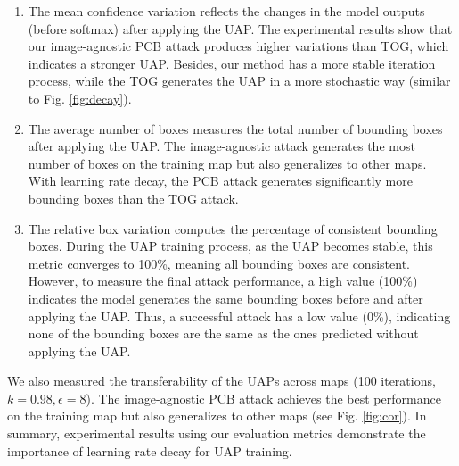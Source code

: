 \begin{enumerate}
    \item The mean confidence variation reflects the changes in the model outputs (before softmax) after applying the UAP. The experimental results show that our image-agnostic PCB attack produces higher variations than TOG, which indicates a stronger UAP. Besides, our method has a more stable iteration process, while the TOG generates the UAP in a more stochastic way (similar to Fig. \ref{fig:decay}).
    \item The average number of boxes measures the total number of bounding boxes after applying the UAP. The image-agnostic attack generates the most number of boxes on the training map but also generalizes to other maps. With learning rate decay, the PCB attack generates significantly more bounding boxes than the TOG attack.
    \item The relative box variation computes the percentage of consistent bounding boxes. During the UAP training process, as the UAP becomes stable, this metric converges to 100\%, meaning all bounding boxes are consistent. However, to measure the final attack performance, a high value (100\%) indicates the model generates the same bounding boxes before and after applying the UAP. Thus, a successful attack has a low value (0\%), indicating none of the bounding boxes are the same as the ones predicted without applying the UAP.
\end{enumerate}

We also measured the transferability of the UAPs across maps (100 iterations, $k=0.98, \epsilon=8$). The image-agnostic PCB attack achieves the best performance on the training map but also generalizes to other maps (see Fig. \ref{fig:cor}). In summary, experimental results using our evaluation metrics demonstrate the importance of learning rate decay for UAP training.


